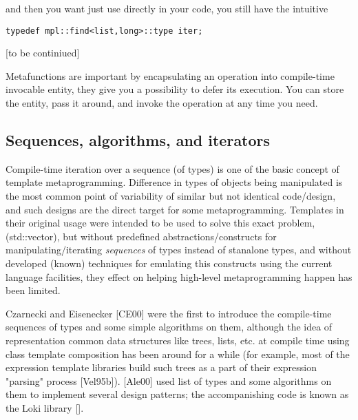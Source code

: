 \documentclass{netobjectdays}
\newcommand{\Mpl}{Boost Meta\-program\-ming Library}
\begin{document}
and then you want just use  directly in your code, 
you still have the intuitive

{\footnotesize
\begin{verbatim}
typedef mpl::find<list,long>::type iter;
\end{verbatim}
}


[to be continiued]


Metafunctions are important by encapsulating an operation into 
compile-time invocable entity, they give you a possibility to 
defer its execution. You can store the entity, pass it around, 
and invoke the operation at any time you need.

\subsection{Sequences, algorithms, and iterators}

Compile-time iteration over a sequence (of types) is one of 
the basic concept of template metaprogramming. Difference in 
types of objects being manipulated is the most common point 
of variability of similar but not identical code/design, and 
such designs are the direct target for some metaprogramming. 
Templates in their original usage were intended to be used to 
solve this exact problem, (std::vector), but without predefined 
abstractions/constructs for manipulating/iterating 
\emph{sequences} of types instead of stanalone types, and 
without developed (known) techniques for emulating this 
constructs using the current language facilities, they effect 
on helping high-level metaprogramming happen has been limited. 

Czarnecki and Eisenecker [CE00] were the first to introduce 
the compile-time sequences of types and some simple algorithms 
on them, although the idea of representation common data 
structures like trees, lists, etc. at compile time using class 
template composition has been around for a while (for example, 
most of the expression template libraries build such trees as 
a part of their expression "parsing" process [Vel95b]). 
[Ale00] used list of types and some algorithms on them to 
implement several design patterns; the accompanishing code 
is known as the Loki library []. 


\end{document}
